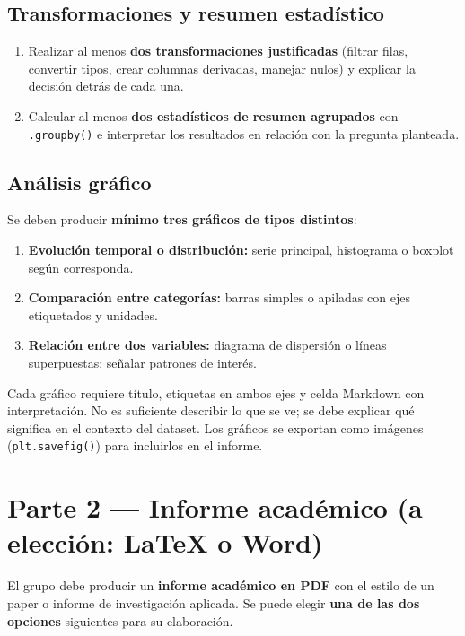 \documentclass[11pt,a4paper]{article}
\begin{document}
\subsection{Transformaciones y resumen estadístico}
\begin{caja}
\begin{enumerate}[label=\alph*), leftmargin=1.6em, itemsep=2pt]
  \item Realizar al menos \textbf{dos transformaciones justificadas} (filtrar filas, convertir tipos,
        crear columnas derivadas, manejar nulos) y explicar la decisión detrás de cada una.
  \item Calcular al menos \textbf{dos estadísticos de resumen agrupados} con \texttt{.groupby()} e
        interpretar los resultados en relación con la pregunta planteada.
\end{enumerate}
\end{caja}

\subsection{Análisis gráfico}
\begin{caja}
Se deben producir \textbf{mínimo tres gráficos de tipos distintos}:
\begin{enumerate}[label=\alph*), leftmargin=1.6em, itemsep=2pt]
  \item \textbf{Evolución temporal o distribución:} serie principal, histograma o boxplot según
        corresponda.
  \item \textbf{Comparación entre categorías:} barras simples o apiladas con ejes etiquetados y
        unidades.
  \item \textbf{Relación entre dos variables:} diagrama de dispersión o líneas superpuestas; señalar
        patrones de interés.
\end{enumerate}
Cada gráfico requiere título, etiquetas en ambos ejes y celda Markdown con interpretación.
No es suficiente describir lo que se ve; se debe explicar qué significa en el contexto del dataset.
Los gráficos se exportan como imágenes (\texttt{plt.savefig()}) para incluirlos en el informe.
\end{caja}

\section{Parte 2 --- Informe académico (a elección: \LaTeX{} o Word)}
El grupo debe producir un \textbf{informe académico en PDF} con el estilo de un paper o informe de
investigación aplicada. Se puede elegir \textbf{una de las dos opciones} siguientes para su elaboración.
\end{document}

